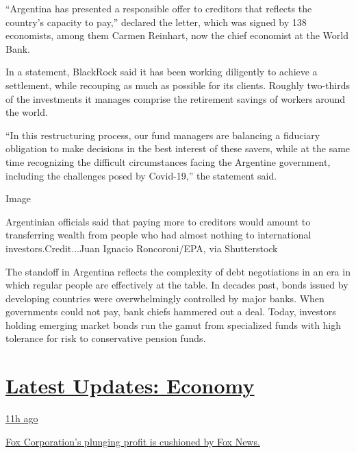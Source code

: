 ``Argentina has presented a responsible offer to creditors that reflects
the country's capacity to pay,'' declared the letter, which was signed
by 138 economists, among them Carmen Reinhart, now the chief economist
at the World Bank.

In a statement, BlackRock said it has been working diligently to achieve
a settlement, while recouping as much as possible for its clients.
Roughly two-thirds of the investments it manages comprise the retirement
savings of workers around the world.

``In this restructuring process, our fund managers are balancing a
fiduciary obligation to make decisions in the best interest of these
savers, while at the same time recognizing the difficult circumstances
facing the Argentine government, including the challenges posed by
Covid-19,'' the statement said.

Image

Argentinian officials said that paying more to creditors would amount to
transferring wealth from people who had almost nothing to international
investors.Credit...Juan Ignacio Roncoroni/EPA, via Shutterstock

The standoff in Argentina reflects the complexity of debt negotiations
in an era in which regular people are effectively at the table. In
decades past, bonds issued by developing countries were overwhelmingly
controlled by major banks. When governments could not pay, bank chiefs
hammered out a deal. Today, investors holding emerging market bonds run
the gamut from specialized funds with high tolerance for risk to
conservative pension funds.

\hypertarget{latest-updates-economy}{%
\section{\texorpdfstring{\href{https://www.nytimes3xbfgragh.onion/live/2020/08/04/business/stock-market-today-coronavirus?action=click\&pgtype=Article\&state=default\&region=MAIN_CONTENT_1\&context=storylines_live_updates}{Latest
Updates:
Economy}}{Latest Updates: Economy}}\label{latest-updates-economy}}

\href{https://www.nytimes3xbfgragh.onion/live/2020/08/04/business/stock-market-today-coronavirus?action=click\&pgtype=Article\&state=default\&region=MAIN_CONTENT_1\&context=storylines_live_updates\#fox-corporations-plunging-profit-is-cushioned-by-fox-news}{11h
ago}

\href{https://www.nytimes3xbfgragh.onion/live/2020/08/04/business/stock-market-today-coronavirus?action=click\&pgtype=Article\&state=default\&region=MAIN_CONTENT_1\&context=storylines_live_updates\#fox-corporations-plunging-profit-is-cushioned-by-fox-news}{Fox
Corporation's plunging profit is cushioned by Fox News.}


